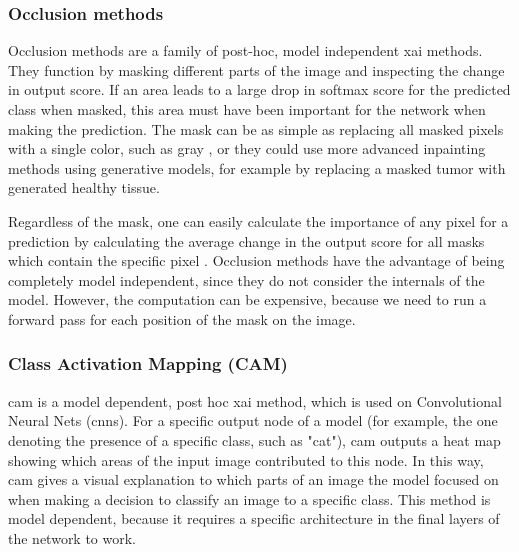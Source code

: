 \documentclass[UKenglish]{uiomasterthesis} %
\theoremstyle{definition}
\begin{document}
\subsubsection{Occlusion methods}

Occlusion methods are a family of post-hoc, model independent \ac{xai} methods. They function by masking different parts of the image and inspecting the change in output score. If an area leads to a large drop in softmax score for the predicted class when masked, this area must have been important for the network when making the prediction. The mask can be as simple as replacing all masked pixels with a single color, such as gray \cite{occlusion}, or they could use more advanced inpainting methods using generative models, for example by replacing a masked tumor with generated healthy tissue. 

Regardless of the mask, one can easily calculate the importance of any pixel for a prediction by calculating the average change in the output score for all masks which contain the specific pixel \cite{diagnostic}. Occlusion methods have the advantage of being completely model independent, since they do not consider the internals of the model. However, the computation can be expensive, because we need to run a forward pass for each position of the mask on the image. %

\subsubsection{Class Activation Mapping (CAM)}

\ac{cam} \cite{cam} is a model dependent, post hoc \ac{xai} method, which is used on Convolutional Neural Nets (\ac{cnn}s). For a specific output node of a model (for example, the one denoting the presence of a specific class, such as "cat"), \ac{cam} outputs a heat map showing which areas of the input image contributed to this node. In this way, \ac{cam} gives a visual explanation to which parts of an image the model focused on when making a decision to classify an image to a specific class. This method is model dependent, because it requires a specific architecture in the final layers of the network to work.
\end{document}
